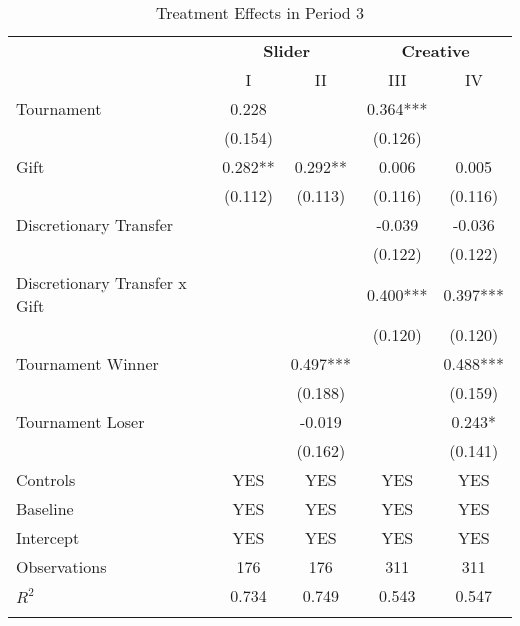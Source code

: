 \begin{table}[h]%
\setlength\tabcolsep{2pt}
\caption{Treatment Effects in Period 3}
\begin{center}%
{\small\renewcommand{\arraystretch}{1}%
\begin{tabular}{lcccc}
\hline\hline\noalign{\smallskip}
 & \multicolumn{2}{c}{\bf Slider} & \multicolumn{2}{c}{\bf Creative} \\
 & I & II & III & IV \\
\hline\noalign{\smallskip}
Tournament          &       0.228   &               &       0.364***&               \\
                    &     (0.154)   &               &     (0.126)   &               \\[2mm]
Gift                &       0.282** &       0.292** &       0.006   &       0.005   \\
                    &     (0.112)   &     (0.113)   &     (0.116)   &     (0.116)   \\[2mm]
Discretionary Transfer&               &               &      -0.039   &      -0.036   \\
                    &               &               &     (0.122)   &     (0.122)   \\
Discretionary Transfer x Gift&               &               &       0.400***&       0.397***\\
                    &               &               &     (0.120)   &     (0.120)   \\
Tournament Winner   &               &       0.497***&               &       0.488***\\
                    &               &     (0.188)   &               &     (0.159)   \\
Tournament Loser    &               &      -0.019   &               &       0.243*  \\
                    &               &     (0.162)   &               &     (0.141)   \\
\noalign{\smallskip}\hline
 Controls  & YES & YES & YES & YES \\
 Baseline  & YES & YES & YES & YES \\
 Intercept & YES & YES & YES & YES \\
\hline
Observations        &         176   &         176   &         311   &         311   \\
$R^2$               &       0.734   &       0.749   &       0.543   &       0.547   \\
\hline\hline\noalign{\medskip}

\end{tabular}}
\end{center}
\end{table}
